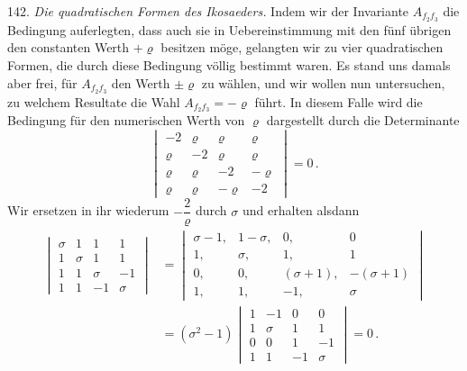 \documentclass[11pt]{article}
\begin{document}
142. %
\textit{Die quadratischen Formen des Ikosaeders.} Indem wir der Invariante $A_{f_2f_3}$ die Bedingung auferlegten, dass auch sie in Uebereinstimmung mit den fünf übrigen den constanten Werth $+\varrho$ besitzen möge, gelangten wir zu vier quadratischen Formen, die durch diese Bedingung völlig bestimmt waren. Es stand uns damals aber frei, für $A_{f_2f_3}$ den Werth $\pm\varrho$ zu wählen, und wir wollen nun untersuchen, zu welchem Resultate die Wahl $A_{f_2f_3}=-\varrho$ führt. In diesem Falle wird die Bedingung für den numerischen Werth von $\varrho$ dargestellt durch die Determinante
\[
\begin{vmatrix}
-2 & \varrho & \varrho & \varrho\\
\varrho & -2 & \varrho & \varrho\\
\varrho & \varrho & -2 & -\varrho\\
\varrho & \varrho & -\varrho & -2
\end{vmatrix} = 0\,.
\]
Wir ersetzen in ihr wiederum $-\dfrac{2}{\varrho}$ durch $\sigma$ und erhalten alsdann
\[
\begin{aligned}
\begin{vmatrix}
\sigma & 1 & 1 & 1\\
1 & \sigma & 1 & 1\\
1 & 1 & \sigma & -1\\
1 & 1 & -1 & \sigma
\end{vmatrix}
&=
\begin{vmatrix}
\sigma-1, & 1-\sigma, & 0, & 0\\
1, & \sigma, & 1, & 1\\
0, & 0, & (\sigma+1), & -(\sigma+1)\\
1, & 1, & -1, & \sigma
\end{vmatrix}\\[4pt]
&= (\sigma^2-1)
\begin{vmatrix}
1 & -1 & 0 & 0\\
1 & \sigma & 1 & 1\\
0 & 0 & 1 & -1\\
1 & 1 & -1 & \sigma
\end{vmatrix} = 0\,.
\end{aligned}
\]
\end{document}

